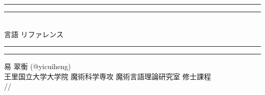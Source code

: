 \begin{titlepage}
  \centering%
  \vspace*{8\baselineskip}
  \rule{\textwidth}{2pt}\vspace*{-\baselineskip}\vspace*{4pt}
  \rule{\textwidth}{1pt}%
  \vspace*{\baselineskip}%
  {\\ \Huge \Yil 言語 リファレンス}%
  \vspace*{0.5\baselineskip}%
  \rule{\textwidth}{1pt}\vspace*{-\baselineskip}\vspace*{5pt}
  \rule{\textwidth}{2pt}%
  \vspace*{20\baselineskip}

  {\Large 易 翠衡 (@yicuiheng)} \\
  {王里国立大学大学院 魔術科学専攻 魔術言語理論研究室 修士課程} \\ \vspace{1em}
  {\large \number\year/\number\month/\number\day}
\end{titlepage}
